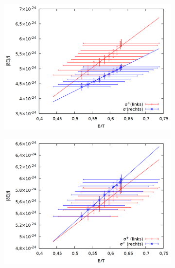 \begin{figure}
\centering
\begin{subfigure}{0.6\textwidth}
\includegraphics[width=\textwidth]{data/zeeman/out_zeeman_neu_links.png}
\end{subfigure}
\begin{subfigure}{0.6\textwidth}
\includegraphics[width=\textwidth]{data/zeeman/out_zeeman_neu_mitte.png}
\end{subfigure}
\begin{subfigure}{0.6\textwidth}

\end{subfigure}
\end{figure}

